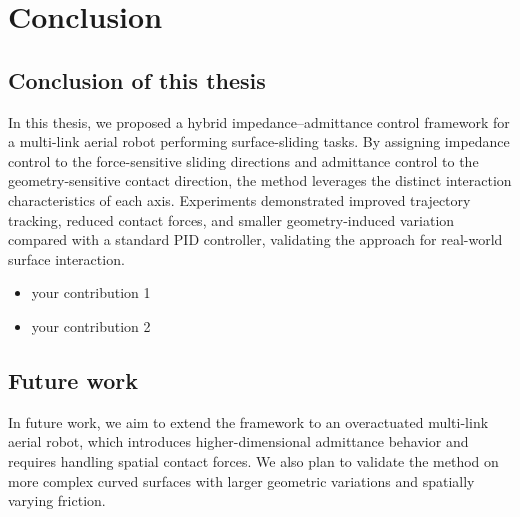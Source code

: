 \chapter{Conclusion}
\section{Conclusion of this thesis}
In this thesis, we proposed a hybrid impedance–admittance control framework for a multi-link aerial robot performing surface-sliding tasks. By assigning impedance control to the force-sensitive sliding directions and admittance control to the geometry-sensitive contact direction, the method leverages the distinct interaction characteristics of each axis. Experiments demonstrated improved trajectory tracking, reduced contact forces, and smaller geometry-induced variation compared with a standard PID controller, validating the approach for real-world surface interaction.

\begin{itemize}
	\item your contribution 1
	\item your contribution 2
\end{itemize}
\section{Future work}


In future work, we aim to extend the framework to an overactuated multi-link aerial robot, which introduces higher-dimensional admittance behavior and requires handling spatial contact forces. We also plan to validate the method on more complex curved surfaces with larger geometric variations and spatially varying friction.